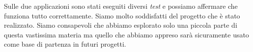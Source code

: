 Sulle due applicazioni sono stati eseguiti diversi \textit{test} e possiamo affermare che funziona tutto correttamente.
Siamo molto soddisfatti del progetto che è stato realizzato. Siamo consapevoli che abbiamo esplorato solo una piccola parte di questa vastissima materia ma quello che abbiamo appreso sarà sicuramente usato come base di partenza in futuri progetti.\\